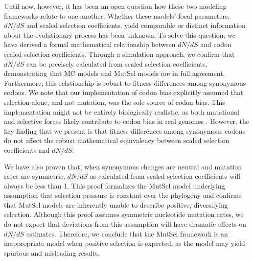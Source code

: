 \documentclass{pnastwo}
\begin{document}
\begin{article}
Until now, however, it has been an open question how these two modeling frameworks relate to one another. Whether these models' focal parameters, $dN/dS$ and scaled selection coefficients, yield comparable or distinct information about the evolutionary process has been unknown. To solve this question, we have derived a formal mathematical relationship between $dN/dS$ and codon scaled selection coefficients. Through a simulation approach, we confirm that $dN/dS$ can be precisely calculated from scaled selection coefficients, demonstrating that MC models and MutSel models are in full agreement. Furthermore, this relationship is robust to fitness differences among synonymous codons. We note that our implementation of codon bias explicitly assumed that selection alone, and not mutation, was the sole source of codon bias. This implementation might not be entirely biologically realistic, as both mutational and selective forces likely contribute to codon bias in real genomes \cite{Blumer1991, Duret2002, HershbergPetrov2008, Chen2009, PlotkinKudla2010}. However, the key finding that we present is that fitness differences among synonymous codons do not affect the robust mathematical equivalency between scaled selection coefficients and $dN/dS$. 

We have also proven that, when synonymous changes are neutral and mutation rates are symmetric, $dN/dS$ as calculated from scaled selection coefficients will always be less than 1. This proof formalizes the MutSel model underlying assumption that selection pressure is constant over the phylogeny and confirms that MutSel models are inherently unable to describe positive, diversifying selection. Although this proof assumes symmetric nucleotide mutation rates, we do not expect that deviations from this assumption will have dramatic effects on $dN/dS$ estimates. Therefore, we conclude that the MutSel framework is an inappropriate model when positive selection is expected, as the model may yield spurious and misleading results. 


\end{article}
\end{document}
